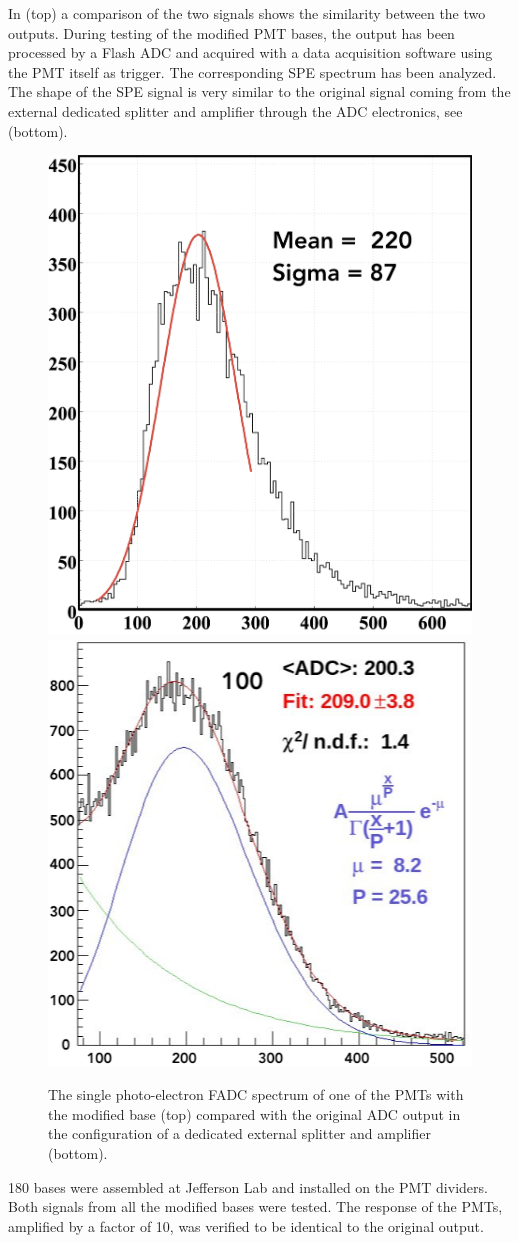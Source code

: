 In  (top) a comparison of the two signals shows the similarity between the two outputs.
During testing of the modified PMT bases, the output has been processed by a Flash ADC and acquired with a data
acquisition software using the PMT itself as trigger.
The corresponding SPE spectrum has been analyzed. The shape of the SPE signal is very similar to the original signal
coming from the external dedicated splitter and amplifier through the ADC electronics, see   (bottom).

\begin{figure}
	\centering
	\includegraphics[width=0.47\columnwidth,height=0.75\columnwidth]{img/fadcOutput.png}
	\includegraphics[width=0.47\columnwidth,height=0.75\columnwidth]{img/cc_signal.png}
	\caption{The single photo-electron FADC spectrum of one of the PMTs with the modified base (top) compared with the original ADC output in the
            configuration of a dedicated external splitter and amplifier (bottom). }
	\label{fig:dividerTests}
\end{figure}

180 bases were assembled at Jefferson Lab and installed on the PMT dividers. Both signals from all the modified bases were tested.
The response of the PMTs, amplified by a factor of 10, was verified to be identical to the original output.


